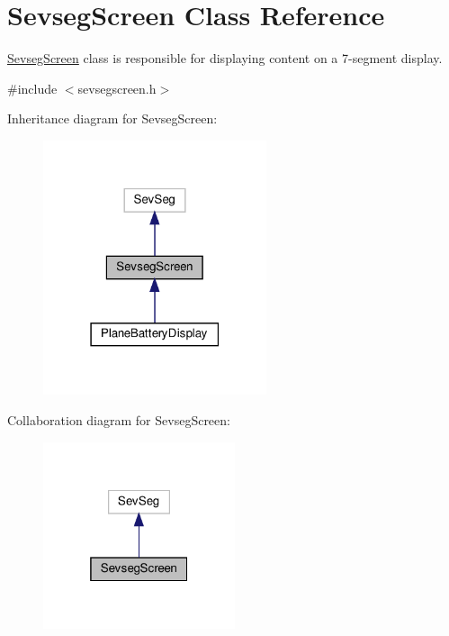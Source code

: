 \hypertarget{class_sevseg_screen}{}\section{Sevseg\+Screen Class Reference}
\label{class_sevseg_screen}


\hyperlink{class_sevseg_screen}{Sevseg\+Screen} class is responsible for displaying content on a 7-\/segment display.  




{\ttfamily \#include $<$sevsegscreen.\+h$>$}



Inheritance diagram for Sevseg\+Screen\+:
\nopagebreak
\begin{figure}[H]
\begin{center}
\leavevmode
\includegraphics[width=186pt]{class_sevseg_screen__inherit__graph}
\end{center}
\end{figure}


Collaboration diagram for Sevseg\+Screen\+:\nopagebreak
\begin{figure}[H]
\begin{center}
\leavevmode
\includegraphics[width=160pt]{class_sevseg_screen__coll__graph}
\end{center}
\end{figure}
